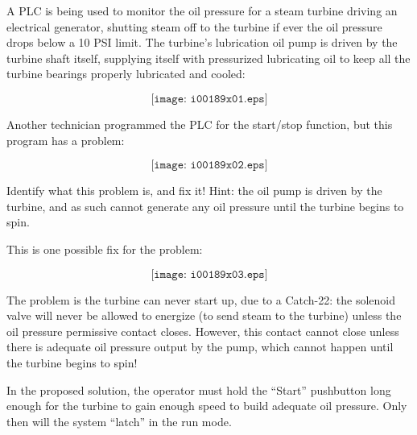 

A PLC is being used to monitor the oil pressure for a steam turbine driving an electrical generator, shutting steam off to the turbine if ever the oil pressure drops below a 10 PSI limit.  The turbine's lubrication oil pump is driven by the turbine shaft itself, supplying itself with pressurized lubricating oil to keep all the turbine bearings properly lubricated and cooled:

$$\texttt{[image: i00189x01.eps]}$$

\vskip 10pt

Another technician programmed the PLC for the start/stop function, but this program has a problem:

$$\texttt{[image: i00189x02.eps]}$$

Identify what this problem is, and fix it!  Hint: the oil pump is driven by the turbine, and as such cannot generate any oil pressure until the turbine begins to spin.







This is one possible fix for the problem:

$$\texttt{[image: i00189x03.eps]}$$







The problem is the turbine can never start up, due to a Catch-22: the solenoid valve will never be allowed to energize (to send steam to the turbine) unless the oil pressure permissive contact closes.  However, this contact cannot close unless there is adequate oil pressure output by the pump, which cannot happen until the turbine begins to spin!

In the proposed solution, the operator must hold the ``Start'' pushbutton long enough for the turbine to gain enough speed to build adequate oil pressure.  Only then will the system ``latch'' in the run mode.










